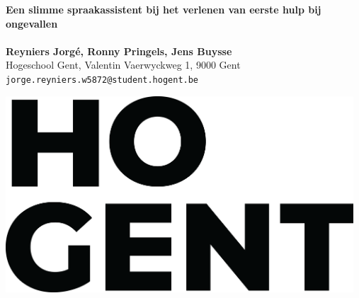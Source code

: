 \documentclass[a0,portrait]{a0poster}
\begin{document}


\begin{minipage}[t]{0.75\linewidth}
\VeryHuge \color{HoGentAccent1} \textbf{Een slimme spraakassistent bij het verlenen van eerste hulp bij ongevallen} \color{Black}\\ %
\Huge\textit{}\\[2.4cm] %
\huge \textbf{Reyniers Jorgé, Ronny Pringels, Jens Buysse}\\[0.5cm] %
\huge Hogeschool Gent, Valentin Vaerwyckweg 1, 9000 Gent\\[0.4cm] %
\Large \texttt{jorge.reyniers.w5872@student.hogent.be} \\
\end{minipage}
%
\begin{minipage}[t]{0.25\linewidth}
\includegraphics[width=13cm,right]{figures/HG-woordmerk.png} 

\end{minipage}

\vspace{1cm} %

\end{document}
